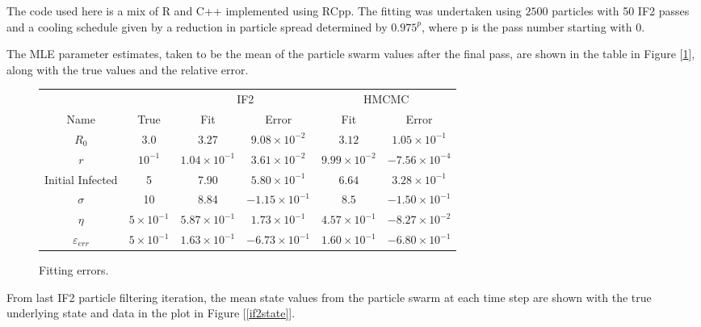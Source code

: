 	The code used here is a mix of R and C++ implemented using RCpp. The fitting was undertaken using $2500$ particles with 50 IF2 passes and a cooling schedule given by a reduction in particle spread determined by $0.975^{p}$, where p is the pass number starting with 0.

	The MLE parameter estimates, taken to be the mean of the particle swarm values after the final pass, are shown in the table in Figure [\ref{fiterror}], along with the true values and the relative error.

	\begin{figure}[H]
		\centering
		{\small
		\begin{tabular}{cccccc}
			& & \multicolumn{2}{c}{IF2} & \multicolumn{2}{c}{HMCMC} \\
			\cmidrule[1.0pt](r){3-4} \cmidrule[1.0pt](r){5-6}
			Name & True	& Fit & Error & Fit & Error \\
			\cmidrule[1.0pt](r){1-1} \cmidrule[1.0pt](r){2-2} \cmidrule[1.0pt](r){3-3} \cmidrule[1.0pt](r){4-4} \cmidrule[1.0pt](r){5-5} \cmidrule[1.0pt](r){6-6}
			$R_0$ 				& 3.0 				 & 3.27 					& $9.08 \times 10^{-2}$ 	& $3.12$ 				& $1.05 \times 10^{-1}$		\\
			$r$ 				& $10^{-1}$  		 & $1.04 \times 10^{-1}$ 	& $3.61 \times 10^{-2}$ 	& $9.99 \times 10^{-2}$ & $-7.56 \times 10^{-4}$	\\
			Initial Infected 	& 5  				 & 7.90 					& $5.80 \times 10^{-1}$ 	& $6.64$ 				& $3.28 \times 10^{-1}$ 	\\
			$\sigma$ 			& 10   				 & 8.84 					& $-1.15 \times 10^{-1}$ 	& $8.5$ 				& $-1.50 \times 10^{-1}$	\\
			$\eta$ 				& $5 \times 10^{-1}$ & $5.87 \times 10^{-1}$ 	& $1.73 \times 10^{-1}$ 	& $4.57 \times 10^{-1}$ & $-8.27 \times 10^{-2}$ 	\\
			$\varepsilon_{err}$ & $5 \times 10^{-1}$ & $1.63 \times 10^{-1}$ 	& $-6.73 \times 10^{-1}$ 	& $1.60 \times10^{-1}$  & $-6.80 \times 10^{-1}$
		\end{tabular}}
	    \caption{Fitting errors. \label{fiterror}}
    \end{figure}


	From last IF2 particle filtering iteration, the mean state values from the particle swarm at each time step are shown with the true underlying state and data in the plot in Figure [\ref{if2state}].

